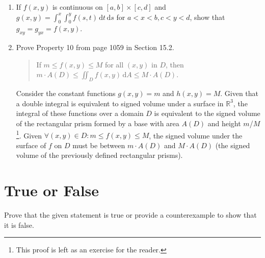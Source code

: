 \documentclass[11pt]{article}
\begin{document}
\begin{enumerate}
\item If \(f(x,y)\) is continuous on \([a,b] \times [c,d]\) and
  \(g(x,y) = \int_0^x \int_0^y f(s,t) \, \mathrm{d}t \, \mathrm{d}s\) for
  \(a < x < b, c < y < d\), show that \(g_{xy} = g_{yx} = f(x,y)\).

\item Prove Property 10 from page 1059 in Section 15.2.
  \begin{quote}
    If \(m \leq f(x,y) \leq M\) for all \((x,y)\) in \(D\), then
    \(m \cdot A(D) \leq \iint_D f(x,y) \, \mathrm{d}A \leq M \cdot A(D)\).
  \end{quote}

  Consider the constant functions \(g(x, y) = m\) and \(h(x, y) = M\). Given
  that a double integral is equivalent to signed volume under a surface in
  \(\mathbb{R}^3\), the integral of these functions over a domain \(D\) is
  equivalent to the signed volume of the rectangular prism formed by a base with
  area \(A(D)\) and height \(m\)/\(M\)\footnote{This proof is left as an
    exercise for the reader.}. Given
  \(\forall (x, y) \in D : m \leq f(x, y) \leq M\), the signed volume under the
  surface of \(f\) on \(D\) must be between \(m \cdot A(D)\) and
  \(M \cdot A(D)\) (the signed volume of the previously defined rectangular
  prisms).
\end{enumerate}

\section*{True or False}
Prove that the given statement is true or provide a counterexample to show that it is false.
\end{document}
